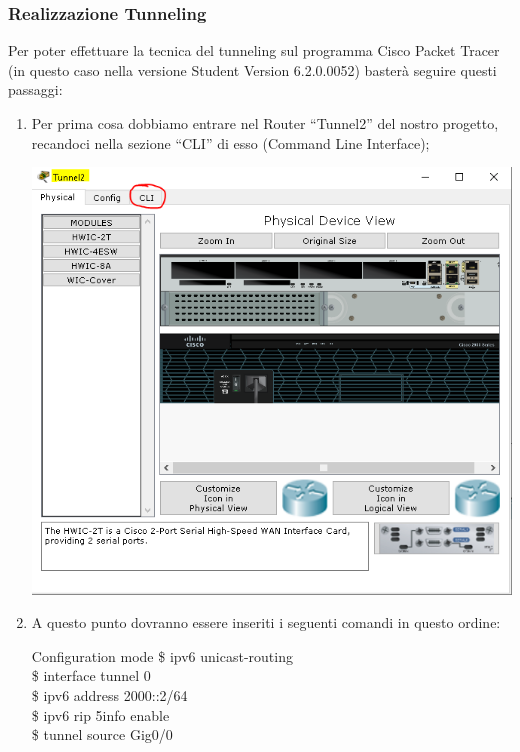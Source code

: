 \subsubsection{Realizzazione Tunneling}
Per poter effettuare la tecnica del tunneling sul programma Cisco Packet Tracer (in questo caso nella versione Student Version 6.2.0.0052) basterà seguire questi passaggi:

\begin{enumerate}
    \item Per prima cosa dobbiamo entrare nel Router “Tunnel2” del nostro progetto, recandoci nella sezione “CLI” di esso (Command Line Interface);\par
    \begin{center}
        \includegraphics[width=\linewidth]{images/07.routing-sicurezza/tunneling/10.png}
    \end{center}
    \item A questo punto dovranno essere inseriti i seguenti comandi in questo ordine:\par
    \begin{fcmds}{Configuration mode}
        \$ ipv6 unicast-routing\\
        \$ interface tunnel 0\\
        \$ ipv6 address 2000::2/64\\
        \$ ipv6 rip 5info enable\\
        \$ tunnel source Gig0/0\\

\end{fcmds}
\end{enumerate}

